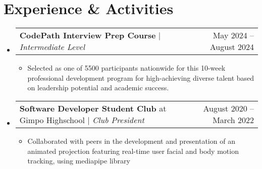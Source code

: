 \documentclass[letterpaper,11pt]{article}
\makeatletter
\newcommand{\resumeItem}[1]{
  \item\small{
    {#1 \vspace{-2pt}}
  }
}
\newcommand{\resumeProjectHeading}[2]{
    \item
    \begin{tabular*}{0.97\textwidth}{l@{\extracolsep{\fill}}r@{\hspace{-0.2in}}}
        \small#1 & #2 \\
    \end{tabular*}\vspace{-7pt}
}
\newcommand{\resumeSubHeadingListStart}{\begin{itemize}[leftmargin=0.00in, rightmargin=-0.2in, label={}]}
\newcommand{\resumeSubHeadingListEnd}{\end{itemize}}
\newcommand{\resumeItemListStart}{\begin{itemize}}
\newcommand{\resumeItemListEnd}{\end{itemize}\vspace{-5pt}}
\makeatother
\begin{document}
\section{Experience \& Activities}
    \resumeSubHeadingListStart
        \resumeProjectHeading
            {\textbf{CodePath Interview Prep Course} $|$ \emph{Intermediate Level}}{May 2024 -- August 2024}
            \resumeItemListStart
                \resumeItem{Selected as one of 5500 participants nationwide for this 10-week professional development program for high-achieving diverse talent based on leadership potential and academic success.}
            \resumeItemListEnd
        \resumeSubHeadingListEnd
    \resumeSubHeadingListStart
        \resumeProjectHeading
            {\textbf{Software Developer Student Club} at Gimpo Highschool $|$ \emph{Club President}}{August 2020 -- March 2022}
            \resumeItemListStart
                \resumeItem{Collaborated with peers in the development and presentation of an animated projection featuring real-time user facial and body motion tracking, using mediapipe library}
            \resumeItemListEnd
        \resumeSubHeadingListEnd

\end{document}
